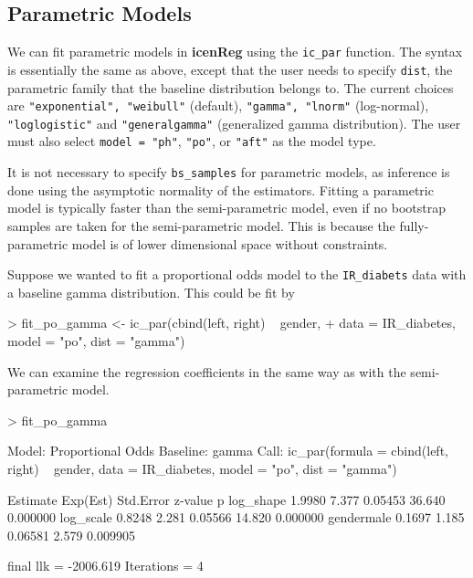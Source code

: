 \documentclass[a4paper]{article}
\begin{document}
\subsection{Parametric Models}
  
We can fit parametric models in {\bf icenReg} using the \texttt{ic\_par} function. The syntax is essentially the same as above, except that the user needs to specify \texttt{dist}, the parametric family that the baseline distribution belongs to. The current choices are \texttt{"exponential", "weibull"} (default), \texttt{"gamma", "lnorm"} (log-normal), \texttt{"loglogistic"} and \texttt{"generalgamma"} (generalized gamma distribution). The user must also select \texttt{model = "ph"},  \texttt{"po"}, or \texttt{"aft"} as the model type. 
  
It is not necessary to specify \texttt{bs\_samples} for parametric models, as inference is done using the asymptotic normality of the estimators. Fitting a parametric model is typically faster than the semi-parametric model, even if no bootstrap samples are taken for the semi-parametric model. This is because the fully-parametric model is of lower dimensional space without constraints. 
  
Suppose we wanted to fit a proportional odds model to the \texttt{IR\_diabets} data with a baseline gamma distribution. This could be fit by
  
\begin{Schunk}
\begin{Sinput}
> fit_po_gamma <- ic_par(cbind(left, right) ~ gender,
+     data = IR_diabetes, model = "po", dist = "gamma")
\end{Sinput}
\end{Schunk}

  We can examine the regression coefficients in the same way as with the semi-parametric model.
  

\begin{Schunk}
\begin{Sinput}
> fit_po_gamma
\end{Sinput}
\begin{Soutput}
Model:  Proportional Odds
Baseline:  gamma 
Call: ic_par(formula = cbind(left, right) ~ gender, data = IR_diabetes, 
    model = "po", dist = "gamma")

           Estimate Exp(Est) Std.Error z-value        p
log_shape    1.9980    7.377   0.05453  36.640 0.000000
log_scale    0.8248    2.281   0.05566  14.820 0.000000
gendermale   0.1697    1.185   0.06581   2.579 0.009905

final llk =  -2006.619 
Iterations =  4 
\end{Soutput}
\end{Schunk}
\end{document}
